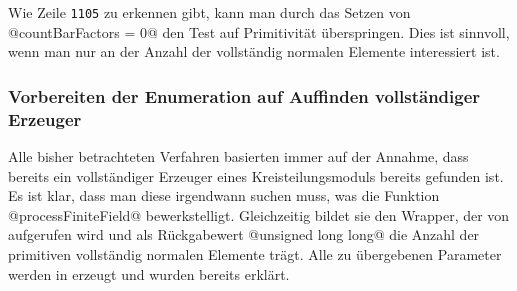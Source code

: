 \begin{bemerkung}
  \label{bem:kein_test_auf_primitivitaet}
  Wie Zeile \texttt{1105} zu erkennen gibt, kann man durch das Setzen von
  @countBarFactors = 0@ den Test auf Primitivität überspringen. Dies ist
  sinnvoll, wenn man nur an der Anzahl der vollständig normalen Elemente
  interessiert ist.
\end{bemerkung}


\subsubsection{Vorbereiten der Enumeration auf Auffinden vollständiger
  Erzeuger}

Alle bisher betrachteten Verfahren basierten immer auf der Annahme, dass
bereits ein vollständiger Erzeuger eines Kreisteilungsmoduls bereits gefunden
ist. Es ist klar, dass man diese irgendwann suchen muss, was die Funktion
@processFiniteField@ bewerkstelligt. Gleichzeitig bildet sie den Wrapper, der
von \sage aufgerufen wird und als Rückgabewert @unsigned long long@ die Anzahl
der primitiven vollständig normalen Elemente trägt. Alle zu übergebenen
Parameter werden in \sage erzeugt und wurden bereits erklärt.


